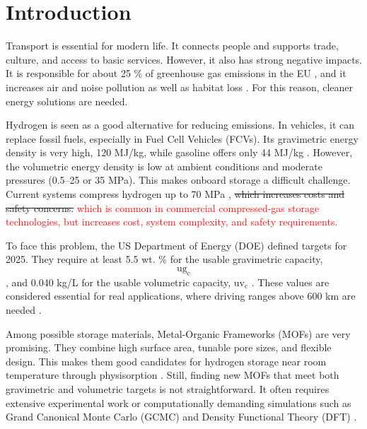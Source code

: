 \documentclass[review]{elsarticle}
\newcommand{\ugc}{$\mathrm{ug_c}$}
\newcommand{\uvc}{\mathrm{uv_c}}
\begin{document}
\begin{frontmatter}
\begin{abstract}
\end{abstract}


\end{frontmatter}

\section{Introduction}

Transport is essential for modern life. It connects people and supports trade, culture, and access to basic services. However, it also has strong negative impacts. It is responsible for about 25 \% of greenhouse gas emissions in the EU \cite{zjb+24,cde+22,jena11}, and it increases air and noise pollution as well as habitat loss \cite{tm24}. For this reason, cleaner energy solutions are needed.

Hydrogen is seen as a good alternative for reducing emissions. In vehicles, it can replace fossil fuels, especially in Fuel Cell Vehicles (FCVs). Its gravimetric energy density is very high, 120 MJ/kg, while gasoline offers only 44 MJ/kg \cite{doe25}. However, the volumetric energy density is low at ambient conditions and moderate pressures (0.5–25 or 35 MPa). This makes onboard storage a difficult challenge. Current systems compress hydrogen up to 70 MPa \cite{atd20}, 
\sout{which increases costs and safety concerns.}
\textcolor{red}{which is common in commercial compressed-gas storage technologies, but increases cost, system complexity, and safety requirements.}

To face this problem, the US Department of Energy (DOE) defined targets for 2025. They require at least 5.5 wt. \% for the usable gravimetric capacity, $\ugc$, and 0.040 kg/L for the usable volumetric capacity, $\uvc$ \cite{doe25,ahg+18}. These values are considered essential for real applications, where driving ranges above 600 km are needed \cite{cwlcz23,bww+21,breeze18,hv14,dy11}.

Among possible storage materials, Metal-Organic Frameworks (MOFs) are very promising. They combine high surface area, tunable pore sizes, and flexible design. This makes them good candidates for hydrogen storage near room temperature through physisorption \cite{gc24}. Still, finding new MOFs that meet both gravimetric and volumetric targets is not straightforward. It often requires extensive experimental work or computationally demanding simulations such as Grand Canonical Monte Carlo (GCMC) and Density Functional Theory (DFT) \cite{ltc24,cltgv21}.
\end{document}
